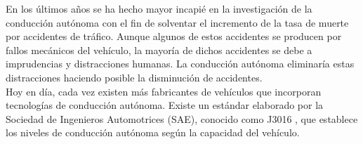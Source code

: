 En los últimos años se ha hecho mayor incapié en la investigación de la conducción autónoma con el fin de solventar el incremento de la tasa de muerte por accidentes de tráfico. Aunque algunos de estos accidentes se producen por fallos mecánicos del vehículo, la mayoría de dichos accidentes se debe a imprudencias y distracciones humanas. La conducción autónoma eliminaría estas distracciones haciendo posible la disminución de accidentes.\\

Hoy en día, cada vez existen más fabricantes de vehículos que incorporan tecnologías de conducción autónoma. Existe un estándar elaborado por la Sociedad de Ingenieros Automotrices (SAE), conocido como J3016 \cite{sae}, que establece los niveles de conducción autónoma según la capacidad del vehículo.\\

